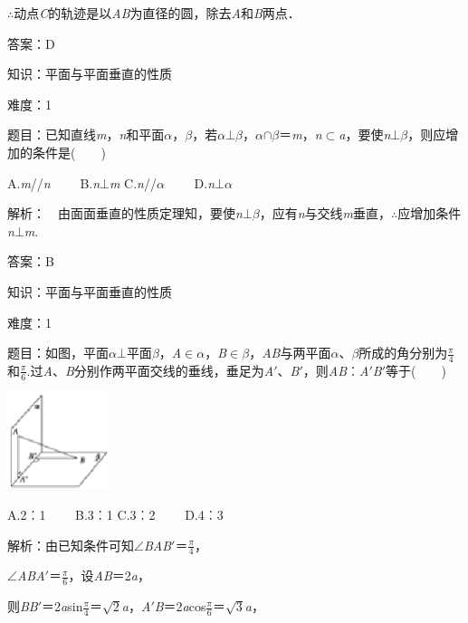 \documentclass{article} %
\begin{document}
$\mathrm{\therefore}$动点\textit{C}的轨迹是以\textit{AB}为直径的圆，除去\textit{A}和\textit{B}两点．

答案：D

知识：平面与平面垂直的性质

难度：1

题目：已知直线\textit{m}，\textit{n}和平面\textit{$\alpha$}，\textit{$\beta$}，若\textit{$\alpha$}$\mathrm{\bot}$\textit{$\beta$}，\textit{$\alpha$}$\mathrm{\cap}$\textit{$\beta$}＝\textit{m}，\textit{n}$\mathrm{\subset }$\textit{a}，要使\textit{n}$\mathrm{\bot}$\textit{$\beta$}，则应增加的条件是(　　)

A.\textit{m}//\textit{n}　　 B.\textit{n}$\mathrm{\bot}$\textit{m }C.\textit{n}//\textit{$\alpha$}　　 D.\textit{n}$\mathrm{\bot}$\textit{$\alpha$}

解析：　由面面垂直的性质定理知，要使\textit{n}$\mathrm{\bot}$\textit{$\beta$}，应有\textit{n}与交线\textit{m}垂直，$\mathrm{\therefore}$应增加条件\textit{n}$\mathrm{\bot}$\textit{m}.

答案：B

知识：平面与平面垂直的性质

难度：1

题目：如图，平面\textit{$\alpha$}$\mathrm{\bot}$平面\textit{$\beta$}，\textit{A}$\mathrm{\in}$\textit{$\alpha$}，\textit{B}$\mathrm{\in}$\textit{$\beta$}，\textit{AB}与两平面\textit{$\alpha$}、\textit{$\beta$}所成的角分别为$\frac{\pi}{4}$和$\frac{\pi}{6}$.过\textit{A}、\textit{B}分别作两平面交线的垂线，垂足为\textit{A}$'$、\textit{B}$'$，则\textit{AB}︰\textit{A}$'$\textit{B}$'$等于(　　)

\includegraphics*[width=1.19in, height=1.11in, keepaspectratio=false]{image252}

A.2︰1　　 B.3︰1 C.3︰2　　 D.4︰3

解析：由已知条件可知$\mathrm{\angle}$\textit{BAB}$'$＝$\frac{\pi}{4}$，

$\mathrm{\angle}$\textit{ABA}$'$＝$\frac{\pi}{6}$，设\textit{AB}＝2\textit{a}，

则\textit{BB}$'$＝2\textit{a}sin$\frac{\pi}{4}$＝$\sqrt{2}$\textit{a}，\textit{A}$'$\textit{B}＝2\textit{a}cos$\frac{\pi}{6}$＝$\sqrt{3}$\textit{a}，
\end{document}
